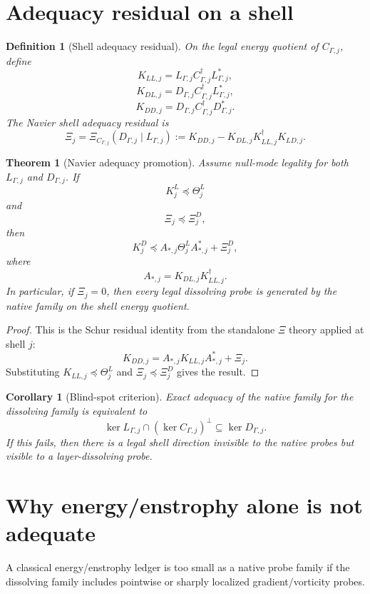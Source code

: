 \documentclass[11pt]{article}
\newtheorem{theorem}{Theorem}
\newtheorem{definition}{Definition}
\newtheorem{corollary}{Corollary}
\begin{document}
\section{Adequacy residual on a shell}
\begin{definition}[Shell adequacy residual]
On the legal energy quotient of $C_{\Gamma,j}$, define
\[
K_{LL,j}=L_{\Gamma,j}C_{\Gamma,j}^{\dagger}L_{\Gamma,j}^*,
\]
\[
K_{DL,j}=D_{\Gamma,j}C_{\Gamma,j}^{\dagger}L_{\Gamma,j}^*,
\]
\[
K_{DD,j}=D_{\Gamma,j}C_{\Gamma,j}^{\dagger}D_{\Gamma,j}^*.
\]
The Navier shell adequacy residual is
\[
\boxed{
\Xi_j=\Xi_{C_{\Gamma,j}}(D_{\Gamma,j}\mid L_{\Gamma,j})
:=K_{DD,j}-K_{DL,j}K_{LL,j}^{\dagger}K_{LD,j}.
}
\]
\end{definition}

\begin{theorem}[Navier adequacy promotion]
Assume null-mode legality for both $L_{\Gamma,j}$ and $D_{\Gamma,j}$. If
\[
K^L_j\preceq \Theta^L_j
\]
and
\[
\Xi_j\preceq \Xi^D_j,
\]
then
\[
\boxed{
K^D_j\preceq A_{*,j}\Theta^L_jA_{*,j}^*+\Xi^D_j,
}
\]
where
\[
A_{*,j}=K_{DL,j}K_{LL,j}^{\dagger}.
\]
In particular, if $\Xi_j=0$, then every legal dissolving probe is generated by the native family on the shell energy quotient.
\end{theorem}

\begin{proof}
This is the Schur residual identity from the standalone $\Xi$ theory applied at shell $j$:
\[
K_{DD,j}=A_{*,j}K_{LL,j}A_{*,j}^*+\Xi_j.
\]
Substituting $K_{LL,j}\preceq \Theta^L_j$ and $\Xi_j\preceq\Xi^D_j$ gives the result.
\end{proof}

\begin{corollary}[Blind-spot criterion]
Exact adequacy of the native family for the dissolving family is equivalent to
\[
\boxed{
\ker L_{\Gamma,j}\cap (\ker C_{\Gamma,j})^\perp\subseteq \ker D_{\Gamma,j}.
}
\]
If this fails, then there is a legal shell direction invisible to the native probes but visible to a layer-dissolving probe.
\end{corollary}

\section{Why energy/enstrophy alone is not adequate}
A classical energy/enstrophy ledger is too small as a native probe family if the dissolving family includes pointwise or sharply localized gradient/vorticity probes.
\end{document}
